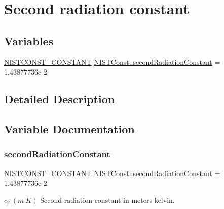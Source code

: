 \hypertarget{group___n_i_s_t_const-_second_radiation_constant}{}\section{Second radiation constant}
\label{group___n_i_s_t_const-_second_radiation_constant}
\subsection*{Variables}
\begin{DoxyCompactItemize}
\item 
\mbox{\hyperlink{group___n_i_s_t_const-_macros_ga2b0fc1d7452373f816175dd86ce26729}{N\+I\+S\+T\+C\+O\+N\+S\+T\+\_\+\+C\+O\+N\+S\+T\+A\+NT}} \mbox{\hyperlink{group___n_i_s_t_const-_second_radiation_constant_ga74b8e08fa5ed49bad92104db721dffcb}{N\+I\+S\+T\+Const\+::second\+Radiation\+Constant}} = 1.\+43877736e-\/2
\end{DoxyCompactItemize}


\subsection{Detailed Description}


\subsection{Variable Documentation}
\mbox{\label{group___n_i_s_t_const-_second_radiation_constant_ga74b8e08fa5ed49bad92104db721dffcb}} 
\subsubsection{\texorpdfstring{second\+Radiation\+Constant}{secondRadiationConstant}}
{\footnotesize\ttfamily \mbox{\hyperlink{group___n_i_s_t_const-_macros_ga2b0fc1d7452373f816175dd86ce26729}{N\+I\+S\+T\+C\+O\+N\+S\+T\+\_\+\+C\+O\+N\+S\+T\+A\+NT}} N\+I\+S\+T\+Const\+::second\+Radiation\+Constant = 1.\+43877736e-\/2}

$c_2 \ (m\ K)$ Second radiation constant in meters kelvin. 